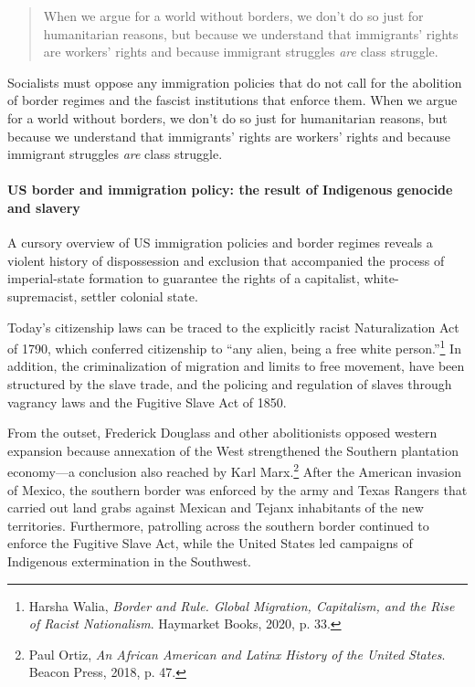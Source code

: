 \blockquote{When we argue for a world without borders, we don't do so just for humanitarian reasons, but because we understand that immigrants' rights are workers' rights and because immigrant struggles \emph{are} class struggle.}

Socialists must oppose any immigration policies that do not call for the abolition of border regimes and the fascist institutions that enforce them. When we argue for a world without borders, we don't do so just for humanitarian reasons, but because we understand that immigrants' rights are workers' rights and because immigrant struggles \emph{are} class struggle.

\paragraph{US border and immigration policy: the result of Indigenous genocide and slavery}

A cursory overview of US immigration policies and border regimes reveals a violent history of dispossession and exclusion that accompanied the process of imperial-state formation to guarantee the rights of a capitalist, white-supremacist, settler colonial state.

Today's citizenship laws can be traced to the explicitly racist Naturalization Act of 1790, which conferred citizenship to ``any alien, being a free white person.''\footnote{Harsha Walia, \emph{Border and Rule. Global Migration, Capitalism, and the Rise of Racist Nationalism}. Haymarket Books, 2020, p. 33.} In addition, the criminalization of migration and limits to free movement, have been structured by the slave trade, and the policing and regulation of slaves through vagrancy laws and the Fugitive Slave Act of 1850.

From the outset, Frederick Douglass and other abolitionists opposed western expansion because annexation of the West strengthened the Southern plantation economy---a conclusion also reached by Karl Marx.\footnote{Paul Ortiz, \emph{An African American and Latinx History of the United States}. Beacon Press, 2018, p. 47.} After the American invasion of Mexico, the southern border was enforced by the army and Texas Rangers that carried out land grabs against Mexican and Tejanx inhabitants of the new territories. Furthermore, patrolling across the southern border continued to enforce the Fugitive Slave Act, while the United States led campaigns of Indigenous extermination in the Southwest.

